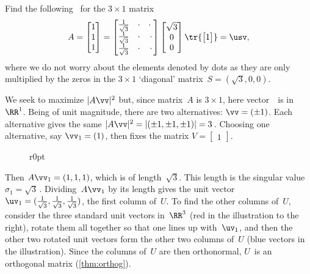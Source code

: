 \begin{example} \label{eg:3x1svd}
\def\thr{\frac1{\sqrt 3}}
Find the following \svd\ for the \(3\times1\) matrix
\begin{equation*}
A=\begin{bmatrix} 1\\1\\1 \end{bmatrix}
=\begin{bmatrix} \thr&\cdot&\cdot\;
\\\thr&\cdot&\cdot
\\\thr&\cdot&\cdot \end{bmatrix}
\begin{bmatrix} \sqrt3\\0\\0 \end{bmatrix}
\tr{\begin{bmatrix} 1 \end{bmatrix}}=\usv,
\end{equation*}
where we do not worry about the elements denoted by dots as they are only multiplied by the zeros in the \(3\times1\) `diagonal' matrix~\(S=(\sqrt3,0,0)\).
\begin{solution} 
We seek to maximize \(|A\vv|^2\) but, since matrix~\(A\) is \(3\times1\), here vector~\vv\ is in~\(\RR^1\).  
Being of unit magnitude, there are two alternatives: \(\vv=(\pm 1)\). 
Each alternative gives the same \(|A\vv|^2=|(\pm1,\pm1,\pm1)|=3\)\,.  
Choosing one alternative, say \(\vv_1=(1)\), then fixes the matrix \(V=\begin{bmatrix} 1 \end{bmatrix}\).

\begin{figure}r{0pt}
\end{figure}
Then \(A\vv_1=(1,1,1)\), which is of length~\(\sqrt3\).
This length is the singular value \(\sigma_1=\sqrt3\)\,.  
Dividing~\(A\vv_1\) by its length gives the unit vector \(\uv_1=(\thr,\thr,\thr)\), the first column of~\(U\).  
To find the other columns of~\(U\), consider the three standard unit vectors in~\(\RR^3\) (red in the illustration to the right), rotate them all together so that one lines up with~\(\uv_1\), and then the other two rotated unit vectors form the other two columns of~\(U\) (blue vectors in the illustration).  
Since the columns of~\(U\) are then orthonormal, \(U\)~is an orthogonal matrix (\cref{thm:orthog}).
\aqed


\end{solution}
\end{example}
